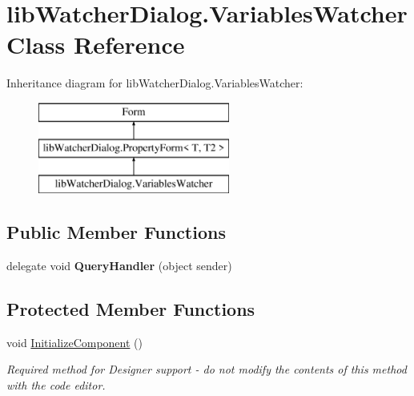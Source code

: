 \hypertarget{classlib_watcher_dialog_1_1_variables_watcher}{\section{lib\+Watcher\+Dialog.\+Variables\+Watcher Class Reference}
\label{classlib_watcher_dialog_1_1_variables_watcher}
}
Inheritance diagram for lib\+Watcher\+Dialog.\+Variables\+Watcher\+:\begin{figure}[H]
\begin{center}
\leavevmode
\includegraphics[height=3.000000cm]{classlib_watcher_dialog_1_1_variables_watcher}
\end{center}
\end{figure}
\subsection*{Public Member Functions}
\begin{DoxyCompactItemize}
\item 
\hypertarget{classlib_watcher_dialog_1_1_variables_watcher_a719f45c53007d85b786ba4a5238c37ad}{delegate void {\bfseries Query\+Handler} (object sender)}\label{classlib_watcher_dialog_1_1_variables_watcher_a719f45c53007d85b786ba4a5238c37ad}

\end{DoxyCompactItemize}
\subsection*{Protected Member Functions}
\begin{DoxyCompactItemize}
\item 
void \hyperlink{classlib_watcher_dialog_1_1_variables_watcher_a0780649c13902bbc268c4b3625ea280b}{Initialize\+Component} ()
\begin{DoxyCompactList}\small\item\em Required method for Designer support -\/ do not modify the contents of this method with the code editor. \end{DoxyCompactList}\end{DoxyCompactItemize}
